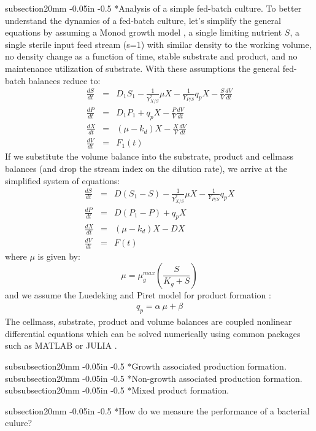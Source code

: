 \documentclass[11pt]{article}
\makeatletter
\theoremstyle{definition}
\renewcommand\subsection{\@startsection
	{subsection}{2}{0mm}
	{-0.05in}
	{-0.5\baselineskip}
	{\normalfont\normalsize\bfseries}}
\renewcommand\subsubsection{\@startsection
	{subsubsection}{2}{0mm}
	{-0.05in}
	{-0.5\baselineskip}
	{\normalfont\normalsize\itshape}}
\makeatother
\begin{document}
\subsection*{Analysis of a simple fed-batch culture.}
To better understand the dynamics of a fed-batch culture, let's simplify the general equations by assuming a Monod growth model \citep{Legout:2010aa}, a single limiting nutrient $S$, a single sterile input feed stream (s=1)
with similar density to the working volume, no density change as a function of time, stable substrate and product, and no maintenance utilization of substrate.
With these assumptions the general fed-batch balances reduce to:
\begin{eqnarray}\label{eqn-metabolite-batch-simple}
	\frac{dS}{dt} &=& D_{1}S_{1} - \frac{1}{Y_{X/S}^{*}}\mu X - \frac{1}{Y_{P/S}}q_{p} X - \frac{S}{V}\frac{dV}{dt}\\
	\frac{dP}{dt} &=& D_{1}P_{1} + q_{p}X - \frac{P}{V}\frac{dV}{dt}\\
	\frac{dX}{dt} &=& \left(\mu - k_{d}\right)X - \frac{X}{V}\frac{dV}{dt}\\
	\frac{dV}{dt} &=& F_{1}\left(t\right)
\end{eqnarray}
If we substitute the volume balance into the substrate, product and cellmass balances (and drop the stream index on the dilution rate), we arrive at the simplified system of equations:
\begin{eqnarray}\label{eqn-metabolite-fedbatch-simple}
	\frac{dS}{dt} &=& D\left(S_{1} - S\right) - \frac{1}{Y_{X/S}^{*}}\mu X - \frac{1}{Y_{P/S}}q_{p} X\\
	\frac{dP}{dt} &=& D\left(P_{1}- P\right) + q_{p}X\\
	\frac{dX}{dt} &=& \left(\mu - k_{d}\right)X - DX \\
	\frac{dV}{dt} &=& F\left(t\right)
\end{eqnarray}
where $\mu$ is given by:
\begin{equation}\label{eqn-monod-growth-model}
	\mu = \mu_{g}^{max}\left(\frac{S}{K_{g} + S}\right)
\end{equation} and we assume the Luedeking and Piret model for product formation \citep{Luedeking:2000aa}:
\begin{eqnarray}
	q_{p} = \alpha~\mu+\beta
\end{eqnarray}
The cellmass, substrate, product and volume balances are coupled nonlinear differential equations which can be solved numerically using common packages such as MATLAB or JULIA \citep{BEKS14}.

\subsubsection*{Growth associated production formation.}
\subsubsection*{Non-growth associated production formation.}
\subsubsection*{Mixed product formation.}

\subsection*{How do we measure the performance of a bacterial culure?}


\end{document}
